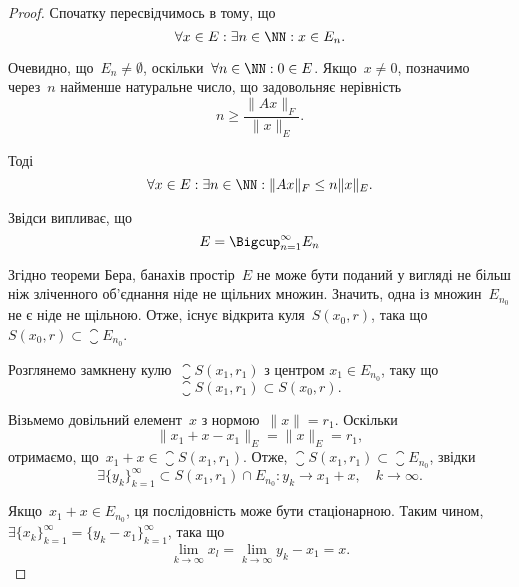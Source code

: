 \begin{proof}
Спочатку пересвідчимось в тому, що
\begin{equation*}
    \forall x \in E: \exists n \in \NN: x \in E_n.
\end{equation*}

Очевидно, що~$E_n \ne \emptyset$, оскільки~$\forall n \in \NN: 0 \in E$.
Якщо~$x \ne 0$, позначимо через~$n$ найменше натуральне число, що
задовольняє нерівність
\begin{equation*}
    n \ge \frac{\|A x\|_F}{\|x\|_E}.
\end{equation*}

Тоді
\begin{equation*}
    \forall x \in E: \exists n \in \NN: \|Ax\|_F \le n \|x\|_E.
\end{equation*}

Звідси випливає, що
\begin{equation*}
    E = \Bigcup_{n = 1}^\infty E_n
\end{equation*}

Згідно теореми Бера, банахів простір~$E$ не може бути
поданий у вигляді не більш ніж зліченного об’єднання ніде
не щільних множин. Значить, одна із множин~$E_{n_0}$ не є ніде
не щільною. Отже, існує відкрита куля~$S(x_0, r)$, така що
$S(x_0, r) \subset \closure E_{n_0}$.

Розглянемо замкнену кулю~$\closure S(x_1, r_1)$ з центром
$x_1 \in E_{n_0}$, таку що
\begin{equation*}
    \closure S(x_1, r_1) \subset S(x_0, r).
\end{equation*}

Візьмемо довільний елемент~$x$ з нормою~$\|x\| = r_1$. Оскільки
\begin{equation*}
    \|x_1 + x - x_1\|_E = \|x\|_E = r_1,
\end{equation*}
отримаємо, що~$x_1 + x \in \closure S(x_1, r_1)$. Отже,
$\closure S(x_1, r_1) \subset \closure E_{n_0}$, звідки
\begin{equation*}
    \exists \{y_k\}_{k = 1}^\infty \subset S(x_1, r_1) \cap E_{n_0}:
    y_k \to x_1 + x, \quad k \to \infty.
\end{equation*}

Якщо~$x_1 + x \in E_{n_0}$, ця послідовність може бути стаціонарною.
Таким чином,~$\exists \{x_k\}_{k = 1}^\infty = \{y_k - x_1\}_{k = 1}^\infty$, така
що
\begin{equation*}
    \lim_{k \to \infty} x_l = \lim_{k \to \infty} y_k - x_1 = x.
\end{equation*}


\end{proof}
